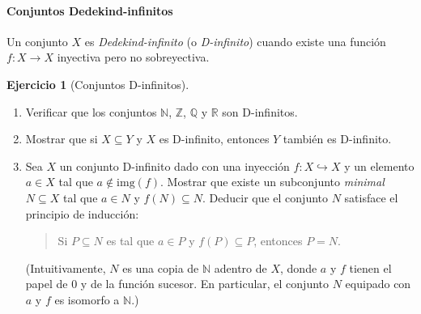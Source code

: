 \documentclass[a4paper,12pt]{book}
\newcommand{\N}{\mathbb{N}}
\newcommand{\R}{\mathbb{R}}
\def\img{\mathrm{img}}
\def\into{\hookrightarrow}
\def\img{\mathrm{img}}
\def\into{\hookrightarrow}
\def\Z{\mathbb{Z}}
\def\Q{\mathbb{Q}}
\theoremstyle{definition}
\newtheorem{ejercicio}{Ejercicio}
\begin{document}
	\paragraph*{Conjuntos Dedekind-infinitos}
	Un conjunto $X$ es \emph{Dedekind-infinito} (o \emph{D-infinito})
	cuando existe una función $f:X\to X$ inyectiva pero no sobreyectiva.
	
	\begin{ejercicio}[Conjuntos D-infinitos]~\par
		\begin{enumerate}
			\item[(1)] Verificar que los conjuntos $\N$, $\Z$, $\Q$ y $\R$ son
			D-infinitos.
			\item[(2)] Mostrar que si $X\subseteq Y$ y $X$ es D-infinito,
			entonces $Y$ también es D-infinito.
			\item[(3)] Sea $X$ un conjunto D-infinito dado con una inyección
			$f:X\into X$ y un elemento $a\in X$ tal que $a\notin\img(f)$.
			Mostrar que existe un subconjunto \emph{minimal} $N\subseteq X$
			tal que $a\in N$ y $f(N)\subseteq N$.
			Deducir que el conjunto $N$ satisface el principio de inducción:
			\begin{quote}
				Si $P\subseteq N$ es tal que $a\in P$ y
				$f(P)\subseteq P$, entonces $P=N$.
			\end{quote}
			(Intuitivamente, $N$ es una copia de $\N$ adentro de $X$, donde
			$a$ y $f$ tienen el papel de $0$ y de la función sucesor.
			En particular, el conjunto $N$ equipado con $a$ y $f$ es isomorfo
			a $\N$.)
		\end{enumerate}
	\end{ejercicio}
	
\end{document}
